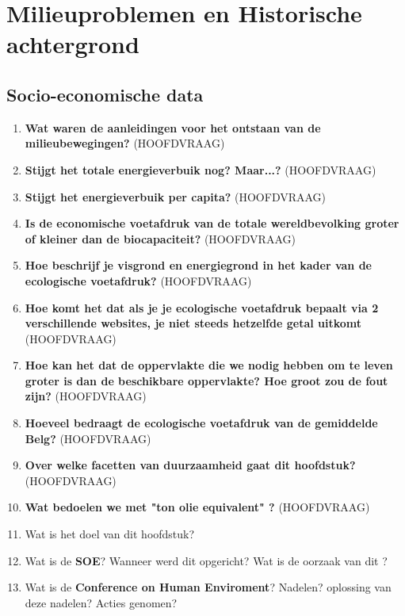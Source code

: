 \documentclass[a4paper,12pt]{article}
\begin{document}
    \maketitle

    \section{Milieuproblemen en Historische achtergrond}
    \subsection{Socio-economische data}
    \begin{enumerate}
        \item \textbf{Wat waren de aanleidingen voor het ontstaan van de milieubewegingen?} (HOOFDVRAAG)
        \item \textbf{Stijgt het totale energieverbuik nog? Maar...?} (HOOFDVRAAG)
        \item \textbf{Stijgt het energieverbuik per capita?} (HOOFDVRAAG)
        \item \textbf{Is de economische voetafdruk van de totale wereldbevolking groter of kleiner dan de biocapaciteit?} (HOOFDVRAAG)
        \item \textbf{Hoe beschrijf je visgrond en energiegrond in het kader van de ecologische voetafdruk?} (HOOFDVRAAG)
        \item \textbf{Hoe komt het dat als je je ecologische voetafdruk bepaalt via 2 verschillende websites, je niet steeds hetzelfde getal uitkomt} (HOOFDVRAAG)
        \item \textbf{Hoe kan het dat de oppervlakte die we nodig hebben om te leven groter is dan de beschikbare oppervlakte? Hoe groot zou de fout zijn?} (HOOFDVRAAG)
        \item \textbf{Hoeveel bedraagt de ecologische voetafdruk van de gemiddelde Belg?} (HOOFDVRAAG)
        \item \textbf{Over welke facetten van duurzaamheid gaat dit hoofdstuk?} (HOOFDVRAAG)
        \item \textbf{Wat bedoelen we met "ton olie equivalent" ?} (HOOFDVRAAG)
        \item Wat is het doel van dit hoofdstuk?
        \item Wat is de \textbf{SOE}? Wanneer werd dit opgericht? Wat is de oorzaak van dit ?
        \item Wat is de \textbf{Conference on Human Enviroment}? Nadelen? oplossing van deze nadelen? Acties genomen?

\end{enumerate}
\end{document}
